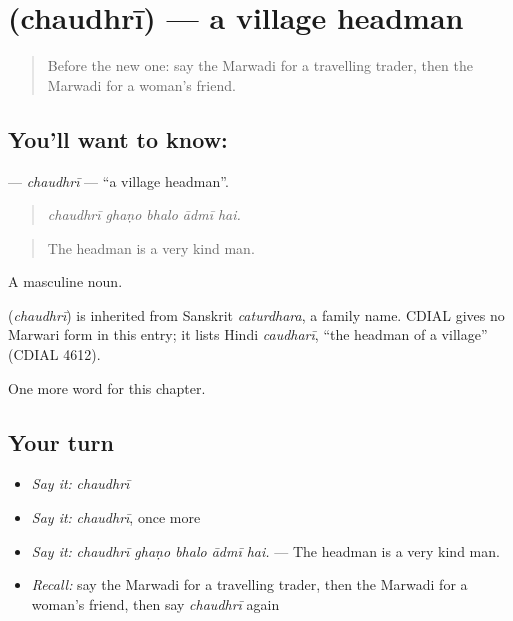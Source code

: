 \section[\texorpdfstring{\mw{चौधरी} (chaudhrī)}{चौधरी (chaudhrī)}]{ (chaudhrī) — a village headman}

\label{lesson:MW-C262-chaudhri}



\begin{quote}
Before the new one: say the Marwadi for a travelling trader, then the Marwadi for a woman's friend.
\end{quote}

\subsection*{You'll want to know: }
\textbf{} — \emph{chaudhrī} — \textquotedblleft{}a village headman\textquotedblright{}.

\begin{quote}
    
\end{quote}

\begin{quote}
\emph{chaudhrī ghaṇo bhalo ādmī hai.}
\end{quote}

\begin{quote}
The headman is a very kind man.
\end{quote}

A masculine noun.

\begin{cousinweb}
\textbf{} (\emph{chaudhrī}) is inherited from Sanskrit \emph{caturdhara}, a family name. CDIAL gives no Marwari form in this entry; it lists Hindi \emph{caudharī}, \textquotedblleft{}the headman of a village\textquotedblright{} (CDIAL 4612).
\end{cousinweb}

\begin{grammarlens}[title={What you've built}]
One more word for this chapter.
\end{grammarlens}

\subsection*{Your turn}
\begin{itemize}
\raggedright
  \item \emph{Say it:} \emph{chaudhrī}
  \item \emph{Say it:} \emph{chaudhrī}, once more
  \item \emph{Say it:} \emph{chaudhrī ghaṇo bhalo ādmī hai.} — The headman is a very kind man.
  \item \emph{Recall:} say the Marwadi for a travelling trader, then the Marwadi for a woman's friend, then say \emph{chaudhrī} again
\end{itemize}

